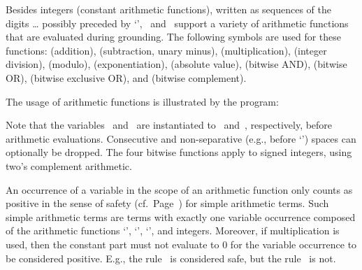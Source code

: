 Besides integers (constant arithmetic functions),
written as sequences of the digits \dots{}
possibly preceded by `\code{-}',
\gringo\ and \clingo\ support a variety of arithmetic functions that
are evaluated during grounding.
The following symbols are used for these functions:
\code{+} (addition),
\code{-} (subtraction, unary minus),
\code{*} (multiplication),
\code{/} (integer division),
\code{\textbackslash} (modulo),
\code{**} (exponentiation),
\code{|$\cdot$|} (absolute value),
\code{\&} (bitwise AND),
 (bitwise OR),
\code{\^} (bitwise exclusive OR), and
\code{\textasciitilde} (bitwise complement).

\begin{example}\label{ex:arith:fun}
The usage of arithmetic functions is illustrated by the program:%
%

%
Note that the variables~ and~ are instantiated to~ and~,
respectively, before arithmetic evaluations.
Consecutive and non-separative (e.g., before `\code{(}')
spaces can optionally be dropped.
The four bitwise functions apply to signed integers,
using two's complement arithmetic.
\end{example}

\begin{note}\label{note:simple}
An occurrence of a variable in the scope of an arithmetic function
only counts as positive in the sense of safety (cf.\ Page~\pageref{pg:safe}) for simple arithmetic terms.
Such simple arithmetic terms are terms with exactly one variable occurrence
composed of the arithmetic functions `\code{+}', `\code{-}', `\code{*}', and integers.
Moreover,
if multiplication is used, then the constant part must not evaluate to $0$ for the variable occurrence to be considered positive.
E.g., the rule~
is considered safe, but
the rule~ is not.
%
\end{note}

